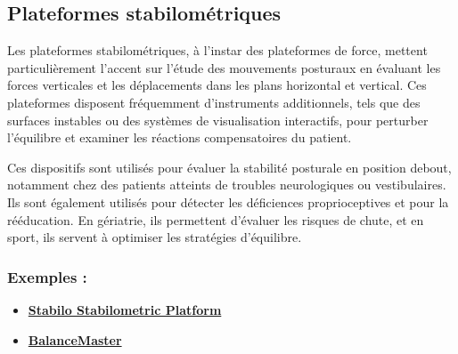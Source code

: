 \subsection{Plateformes stabilométriques}

Les plateformes stabilométriques, à l'instar des plateformes de force, mettent particulièrement l'accent sur l'étude des mouvements posturaux en évaluant les forces verticales et les déplacements dans les plans horizontal et vertical.
Ces plateformes disposent fréquemment d'instruments additionnels, tels que des surfaces instables ou des systèmes de visualisation interactifs, pour perturber l'équilibre et examiner les réactions compensatoires du patient.

Ces dispositifs sont utilisés pour évaluer la stabilité posturale en position debout, notamment chez des patients atteints de troubles neurologiques ou vestibulaires.
Ils sont également utilisés pour détecter les déficiences proprioceptives et pour la rééducation.
En gériatrie, ils permettent d’évaluer les risques de chute, et en sport, ils servent à optimiser les stratégies d’équilibre.

\subsubsection{Exemples : }
\begin{itemize}
  \item \href{https://www.stabilometry.com/}{\textbf{Stabilo Stabilometric Platform}}
  \item \href{https://www.natus.com/products/balancemaster}{\textbf{BalanceMaster}}
\end{itemize}


